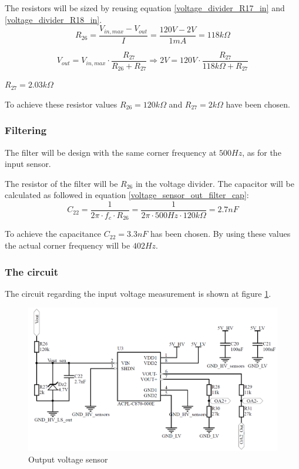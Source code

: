 The resistors will be sized by reusing equation \ref{voltage_divider_R17_in} and \ref{voltage_divider_R18_in}.
\begin{equation}
	R_{26} = \frac{V_{in,max}-V_{out}}{I} = \frac{120V-2V}{1mA} = 118k\Omega	
\end{equation}

\begin{equation} 
	V_{out} = V_{in,max} \cdot \frac{R_{27}}{R_{26}+R_{27}} \Rightarrow 2V = 120V \cdot \frac{R_{27}}{118k\Omega+R_{27}}
\end{equation}
\begin{center}
	$R_{27} = 2.03k\Omega$
\end{center}

To achieve these resistor values $R_{26} = 120k\Omega$ and $R_{27} = 2k\Omega$ have been chosen. 

\subsubsection{Filtering}
The filter will be design with the same corner frequency at $500Hz$, as for the input sensor.

The resistor of the filter will be $R_{26}$ in the voltage divider. The capacitor will be calculated as followed in equation \ref{voltage_sensor_out_filter_cap}:
\begin{equation} \label{voltage_sensor_out_filter_cap}
	C_{22} = \frac{1}{2\pi \cdot f_c \cdot R_{26}} = \frac{1}{2 \pi \cdot 500Hz \cdot 120k\Omega} = 2.7nF
\end{equation}

To achieve the capacitance $C_{22} = 3.3nF$ has been chosen. By using these values the actual corner frequency will be $402 Hz$.

\subsubsection{The circuit}
The circuit regarding the input voltage measurement is shown at figure \ref{fig:output_voltage_sensor_circuit}. 

\begin{figure}[H]
	\begin{center}
		\includegraphics[width=0.7\linewidth]{../Pictures/P1/Sensors/output_voltage_sensor.PNG}
		\caption{Output voltage sensor}
		\label{fig:output_voltage_sensor_circuit}
	\end{center}
\end{figure}
